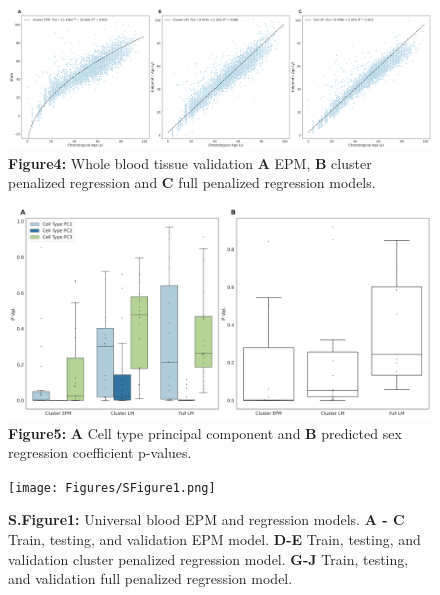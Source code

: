 \documentclass{article}
\begin{document}
{{\begin{raggedleft}
\begin{figure}
\includegraphics[scale=.18]{Figures/Figure4.png}
\footnotesize
\caption*{\small \textbf{Figure4: }Whole blood tissue validation \textbf{A} EPM, \textbf{B} cluster penalized 
regression and \textbf{C} full penalized regression models.}
\end{figure}
\end{raggedleft}

\begin{center}
    \begin{figure}
    \includegraphics[scale=.25]{Figures/Figure5.png}
    \footnotesize
    \caption*{\small \textbf{Figure5: }\textbf{A} Cell type principal component and \textbf{B} predicted sex 
    regression coefficient p-values.
    }
    \end{figure}
\end{center}

\begin{raggedleft}
\begin{figure}
\texttt{[image: Figures/SFigure1.png]}    
\footnotesize
\caption*{\small \textbf{S.Figure1: }Universal blood EPM and regression models. \textbf{A - C} Train, testing, and 
validation EPM model. \textbf{D-E}  Train, testing, and validation cluster penalized regression model. 
\textbf{G-J} Train, testing, and validation full penalized regression model.}
\end{figure}
\end{raggedleft}

}}
\end{document}
